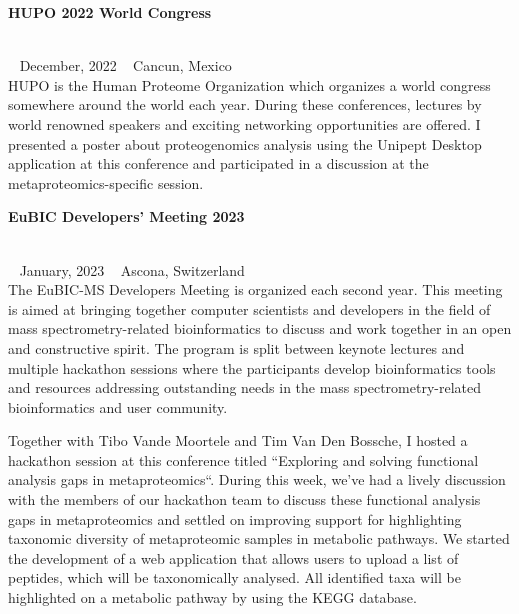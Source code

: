 \begin{large}\textbf{\textsf{HUPO 2022 World Congress}}\end{large} \\
\faCalendar ~ \textsf{December, 2022} \hfill \faGlobe ~ \textsf{Cancun, Mexico} \\
HUPO is the Human Proteome Organization which organizes a world congress somewhere around the world each year.
During these conferences, lectures by world renowned speakers and exciting networking opportunities are offered.
I presented a poster about proteogenomics analysis using the Unipept Desktop application at this conference and participated in a discussion at the metaproteomics-specific session.

\pagebreak

\begin{large}\textbf{\textsf{EuBIC Developers' Meeting 2023}}\end{large} \\
\faCalendar ~ \textsf{January, 2023} \hfill \faGlobe ~ \textsf{Ascona, Switzerland} \\
The EuBIC-MS Developers Meeting is organized each second year.
This meeting is aimed at bringing together computer scientists and developers in the field of mass spectrometry-related bioinformatics to discuss and work together in an open and constructive spirit.
The program is split between keynote lectures and multiple hackathon sessions where the participants develop bioinformatics tools and resources addressing outstanding needs in the mass spectrometry-related bioinformatics and user community.

Together with Tibo Vande Moortele and Tim Van Den Bossche, I hosted a hackathon session at this conference titled ``Exploring and solving functional analysis gaps in metaproteomics``.
During this week, we've had a lively discussion with the members of our hackathon team to discuss these functional analysis gaps in metaproteomics and settled on improving support for highlighting taxonomic diversity of metaproteomic samples in metabolic pathways.
We started the development of a web application that allows users to upload a list of peptides, which will be taxonomically analysed.
All identified taxa will be highlighted on a metabolic pathway by using the KEGG database.

\newpage

